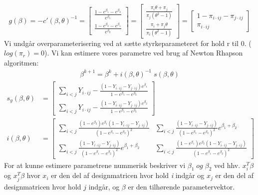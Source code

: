 \documentclass[11pt,a4paper]{article}
\begin{document}
$$
g(\beta)=-c'(\beta,\theta)^{-1}=\begin{bmatrix}\frac{1-e^{\beta_1}-e^{\beta_2}}{e^{\beta_1}}\\ \frac{1-e^{\beta_2}-e^{\beta_1}}{e^{\beta_2}}\end{bmatrix}
=
\begin{bmatrix}
\frac{\pi_i \theta + \pi_j}{\pi_j(\theta^2-1)}\\
\frac{\pi_i+\pi_j \theta}{\pi_i(\theta^2-1)}
\end{bmatrix}=\begin{bmatrix}1-\pi_{i\cdot ij}-\pi_{j\cdot ij}\\\pi_{i\cdot ij}\end{bmatrix}
$$
Vi undgår overparameterisering ved at sætte styrkeparameteret for hold r til 0. ($log(\pi_r)=0$). 
Vi kan estimere vores parametre ved brug af Newton Rhapson algoritmen:
\begin{align}
\beta^{k+1}=\beta^k+i(\beta,\theta)^{-1} \; s(\beta,\theta)
\end{align}
\begin{align}
s_y(\beta,\theta)&=\begin{bmatrix}\sum_{i<j}Y_{i\cdot ij}-\frac{(1-Y_{i\cdot ij}-Y_{j\cdot ij})e^{\beta_1}}{1-e^{\beta_1}-e^{\beta_2}}\\\sum_{i<j}Y_{i\cdot ij}-\frac{(1-Y_{i\cdot ij}-Y_{j\cdot ij})e^{\beta_2}}{1-e^{\beta_1}-e^{\beta_2}}
\end{bmatrix}\\
i(\beta,\theta)
&=\begin{bmatrix}\sum_{i<j}\frac{(1-e^{\beta_2})e^{\beta_1}(1-Y_{i\cdot ij}-Y_{j\cdot ij})}{(1-e^{\beta_1}-e^{\beta_2})^2}
&\sum_{i<j}\frac{(1-Y_{i\cdot ij}-Y_{j\cdot ij})}{(1-e^{\beta_1}-e^{\beta_2})^2}e^{\beta_1+\beta_2}
\\
\sum_{i<j}\frac{(1-Y_{i\cdot ij}-Y_{j\cdot ij})}{(1-e^{\beta_1}-e^{\beta_2})^2}e^{\beta_1+\beta_2}
&\sum_{i<j}\frac{(1-e^{\beta_1})e^{\beta_2}(1-Y_{i\cdot ij}-Y_{j\cdot ij})}{(1-e^{\beta_1}-e^{\beta_2})^2}\end{bmatrix}
\end{align}
For at kunne estimere parametrene nummerisk beskriver vi $\beta_1 \; og \; \beta_2$ ved hhv. $x_i^T\beta$ og $x_{j}^T\beta$ hvor $x_i$ er den del af designmatricen hvor hold \textit{i} indgår og $x_{j}$ er den del af designmatricen hvor hold $j$ indgår, og $\beta$ er den tilhørende parametervektor. 
\end{document}
